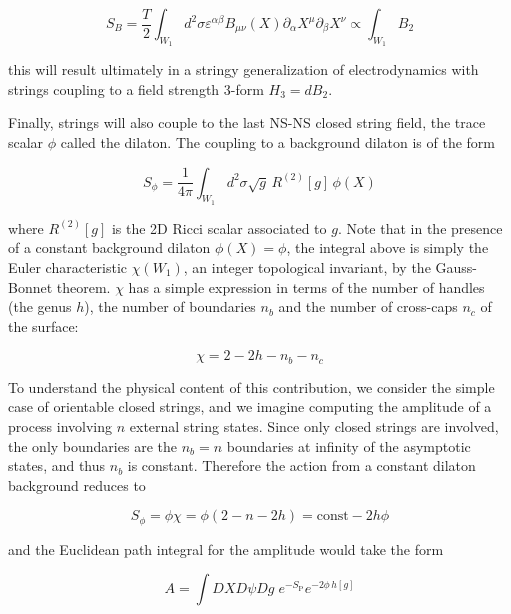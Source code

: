 \begin{equation}
	S_B = \frac{T}{2} \int_{W_1} d^2 \sigma \varepsilon^{\alpha\beta} B_{\mu\nu}(X) \partial_\alpha X^\mu \partial_\beta X^\nu \propto \int_{W_1} B_2
	\label{}
\end{equation}

this will result ultimately in a stringy generalization of electrodynamics with strings coupling to a field strength 3-form $H_3 = dB_2$.

Finally, strings will also couple to the last NS-NS closed string field, the trace scalar $\phi$ called the dilaton. The coupling to a background dilaton is of the form

\begin{equation}
	S_\phi = \frac{1}{4\pi} \int_{W_1} d^2 \sigma \sqrt g \, R^{(2)}[g] \, \phi(X)
	\label{}
\end{equation}

where $R^{(2)}[g]$ is the 2D Ricci scalar associated to $g$. Note that in the presence of a constant background dilaton $\phi(X) = \phi$, the integral above is simply the Euler characteristic $\chi(W_1)$, an integer topological invariant, by the Gauss-Bonnet theorem. $\chi$ has a simple expression in terms of the number of handles (the genus $h$), the number of boundaries $n_b$ and the number of cross-caps $n_c$ of the surface:

\begin{equation}
	\chi = 2 - 2h - n_b - n_c
	\label{}
\end{equation}

To understand the physical content of this contribution, we consider the simple case of orientable closed strings, and we imagine computing the amplitude of a process involving $n$ external string states. Since only closed strings are involved, the only boundaries are the $n_b = n$ boundaries at infinity of the asymptotic states, and thus $n_b$ is constant. Therefore the action from a constant dilaton background reduces to

\begin{equation}
	S_\phi = \phi \chi = \phi(2 - n - 2h) = \text{const} - 2h\phi
	\label{}
\end{equation}

and the Euclidean path integral for the amplitude would take the form

\begin{equation}
	A = \int DX D\psi Dg \; e^{-S_\text{P}} e^{-2\phi \, h[g]}
	\label{}
\end{equation}

